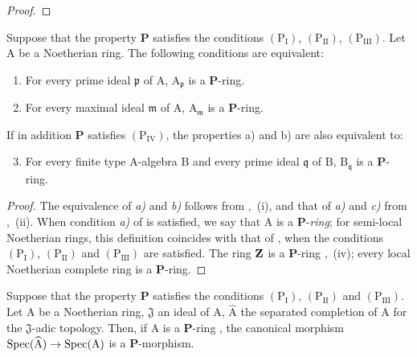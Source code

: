 \begin{proof}
\end{proof}

\begin{corollary}[7.4.5]
\label{IV.7.4.5}
Suppose that the property $\boldsymbol{P}$ satisfies the conditions $(\mathrm{P_I})$, $(\mathrm{P_{II}})$, $(\mathrm{P_{III}})$.
Let $\mathrm{A}$ be a Noetherian ring.
The following conditions are equivalent:
\begin{enumerate}[label=\emph{\alph*)}]
  \item For every prime ideal $\mathfrak{p}$ of $\mathrm{A}$, $\mathrm{A}_\mathfrak{p}$ is a $\boldsymbol{P}$-ring.
  \item For every maximal ideal $\mathfrak{m}$ of $\mathrm{A}$, $\mathrm{A}_\mathfrak{m}$ is a $\boldsymbol{P}$-ring.
\end{enumerate}
If in addition $\boldsymbol{P}$ satisfies $(\mathrm{P_{IV}})$, the properties \textup{a)} and \textup{b)} are also equivalent to:
\begin{enumerate}[label=\emph{\alph*)}]
  \setcounter{enumi}{2}
  \item For every finite type A-algebra $\mathrm{B}$ and every prime ideal $\mathfrak{q}$ of $\mathrm{B}$, $\mathrm{B}_\mathfrak{q}$ is a $\boldsymbol{P}$-ring.
\end{enumerate}
\end{corollary}

\begin{proof}
The equivalence of \emph{a)} and \emph{b)} follows from ,~(i), and that of \emph{a)} and \emph{c)} from ,~(ii).
When condition \emph{a)} of  is satisfied, we say that $\mathrm{A}$ is a $\boldsymbol{P}$-\emph{ring}; for semi-local Noetherian rings, this definition coincides with that of , when the conditions $(\mathrm{P_I})$, $(\mathrm{P_{II}})$ and $(\mathrm{P_{III}})$ are satisfied.
The ring $\mathbf{Z}$ is a $\boldsymbol{P}$-ring ,~(iv); every local Noetherian complete ring is a $\boldsymbol{P}$-ring.
\end{proof}

\begin{proposition}[7.4.6]
\label{IV.7.4.6}
Suppose that the property $\boldsymbol{P}$ satisfies the conditions $(\mathrm{P_I})$, $(\mathrm{P_{II}})$ and $(\mathrm{P_{III}})$.
Let $\mathrm{A}$ be a Noetherian ring, $\mathfrak{J}$ an ideal of $\mathrm{A}$, $\widehat{\mathrm{A}}$ the separated completion of $\mathrm{A}$ for the $\mathfrak{J}$-adic topology.
Then, if $\mathrm{A}$ is a $\boldsymbol{P}$-ring , the canonical morphism $\operatorname{Spec}(\widehat{\mathrm{A}})\to\operatorname{Spec}(\mathrm{A})$ is a $\boldsymbol{P}$-morphism.
\end{proposition}

